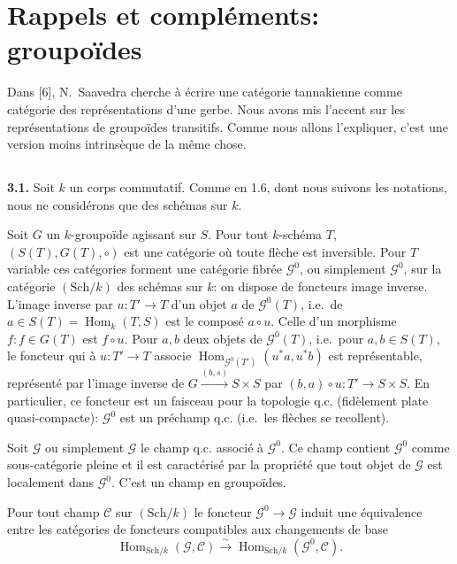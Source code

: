 \documentclass[12pt,a4paper]{article}
\theoremstyle{plain}
\theoremstyle{definition}
\theoremstyle{remark}
\DeclareMathOperator{\Hom}{Hom}
\begin{document}
\section{Rappels et compléments: groupoïdes}

Dans [6], N.~Saavedra cherche à écrire une catégorie tannakienne comme catégorie des représentations d'une gerbe. Nous avons mis l'accent sur les représentations de groupoïdes transitifs. Comme nous allons l'expliquer, c'est une version moins intrinsèque de la même chose.

\subsection{}

\textbf{3.1.} Soit $k$ un corps commutatif. Comme en 1.6, dont nous suivons les notations, nous ne considérons que des schémas sur $k$.

Soit $G$ un $k$-groupoïde agissant sur $S$. Pour tout $k$-schéma $T$, $(S(T), G(T), \circ)$ est une catégorie où toute flèche est inversible. Pour $T$ variable ces catégories forment une catégorie fibrée $\mathcal{G}^0$, ou simplement $\mathcal{G}^0$, sur la catégorie $(\mathrm{Sch}/k)$ des schémas sur $k$: on dispose de foncteurs image inverse. L'image inverse par $u : T' \to T$ d'un objet $a$ de $\mathcal{G}^0(T)$, i.e.~de $a \in S(T) = \Hom_k(T,S)$ est le composé $a \circ u$. Celle d'un morphisme $f : f \in G(T)$ est $f \circ u$. Pour $a,b$ deux objets de $\mathcal{G}^0(T)$, i.e.~pour $a,b \in S(T)$, le foncteur qui à $u : T' \to T$ associe $\Hom_{\mathcal{G}^0(T')}(u^*a, u^*b)$ est représentable, représenté par l'image inverse de $G \xrightarrow{(b,s)} S \times S$ par $(b,a) \circ u : T' \to S \times S$. En particulier, ce foncteur est un faisceau pour la topologie q.c. (fidèlement plate quasi-compacte): $\mathcal{G}^0$ est un préchamp q.c. (i.e.~les flèches se recollent).

Soit $\mathcal{G}$ ou simplement $\mathcal{G}$ le champ q.c. associé à $\mathcal{G}^0$. Ce champ contient $\mathcal{G}^0$ comme sous-catégorie pleine et il est caractérisé par la propriété que tout objet de $\mathcal{G}$ est localement dans $\mathcal{G}^0$. C'est un champ en groupoïdes.

Pour tout champ $\mathcal{C}$ sur $(\mathrm{Sch}/k)$ le foncteur $\mathcal{G}^0 \to \mathcal{G}$ induit une équivalence entre les catégories de foncteurs compatibles aux changements de base
\begin{equation}\label{eq:3.1.1}
\Hom_{\mathrm{Sch}/k}(\mathcal{G}, \mathcal{C}) \xrightarrow{\sim} \Hom_{\mathrm{Sch}/k}(\mathcal{G}^0, \mathcal{C}).
\end{equation}
\end{document}
